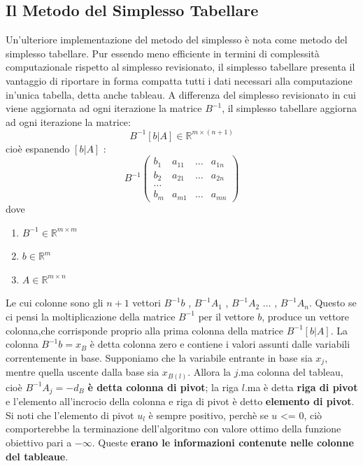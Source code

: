 \subsection{Il Metodo del Simplesso Tabellare}
Un'ulteriore implementazione del metodo del simplesso è nota come metodo del simplesso tabellare.
Pur essendo meno efficiente in termini di complessità computazionale rispetto al simplesso revisionato, il simplesso tabellare presenta il vantaggio di riportare in forma compatta tutti i dati necessari alla computazione in'unica tabella, detta anche tableau.
A differenza del simplesso revisionato in cui viene aggiornata ad ogni iterazione la matrice $B^{-1}$, il simplesso tabellare aggiorna ad ogni iterazione la matrice:
\[
B^{-1} [b | A] \in \mathbb{R}^{m \times (n+1)}
\]
cioè espanendo $[b | A]$ :
\[
B^{-1} \begin{pmatrix} b_1 & a_{11} & \dots & a_{1n} \\  b_2 & a_{21} & \dots & a_{2n} \\ \dots \\  b_m & a_{m1} & \dots & a_{mn} \end{pmatrix}
\]
dove
\begin{enumerate}
    \item $B^{-1} \in \mathbb{R}^{m \times m}$
    \item $b \in \mathbb{R}^m$
    \item $A \in \mathbb{R} ^ {m \times n}$
\end{enumerate}
Le cui colonne sono gli $n + 1$ vettori $B^{-1} b$ , $B^{-1} A_1$ , $B^{-1} A_2$ $\dots$ , $B^{-1} A_n$.
Questo se ci pensi la moltiplicazione della matrice $B^{-1}$ per il vettore $b$, produce un vettore colonna,che corrisponde proprio alla prima colonna della matrice $B^{-1} [b | A]$.
La colonna $B^{-1} b = x_B$ è detta colonna zero e contiene i valori assunti dalle variabili correntemente in base.
Supponiamo che la variabile entrante in base sia $x_j$, mentre quella uscente dalla base sia $x_{B(l)}$.
Allora la $j$.ma colonna del tableau, cioè $B^{-1} A_j = -d_B$ \textbf{è detta colonna di pivot}; la riga $l$.ma è detta \textbf{riga di pivot} e l'elemento all'incrocio della colonna e riga di pivot è detto \textbf{elemento di pivot}.
Si noti che l'elemento di pivot $u_l$ è sempre positivo, perchè se $u$ <= 0, ciò comporterebbe la terminazione dell'algoritmo con valore ottimo
della funzione obiettivo pari a $-\infty $. Queste \textbf{erano le informazioni contenute nelle colonne del tableaue}.


